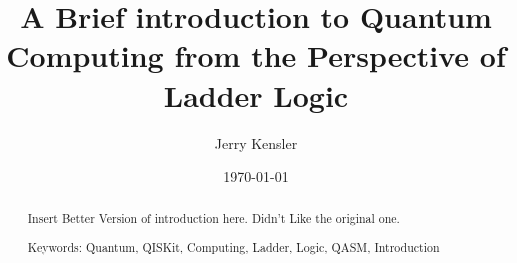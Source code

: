 \documentclass[a4paper]{article}
\title{A Brief introduction to Quantum Computing from the Perspective of Ladder Logic}
\author{Jerry Kensler}
\date{\today}
\begin{document}
\maketitle

\begin{abstract}
	
	
%


Insert Better Version of introduction here.  Didn't Like the original one.

Keywords:  Quantum, QISKit, Computing, Ladder, Logic, QASM, Introduction
\end{abstract}
\end{document}
